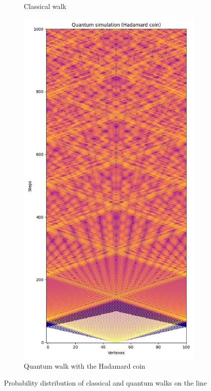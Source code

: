 \begin{figure}[H]
\begin{subfigure}{.45\linewidth}
    \caption{Classical walk}
  \end{subfigure}
  \begin{subfigure}{.45\linewidth}
    \centering
    \includegraphics[width=\linewidth]{./figures/results/path/hadamard.jpg}
    \caption{Quantum walk with the Hadamard coin}
  \end{subfigure}
  \caption{Probability distribution of classical and quantum walks on the line}
\end{figure}

